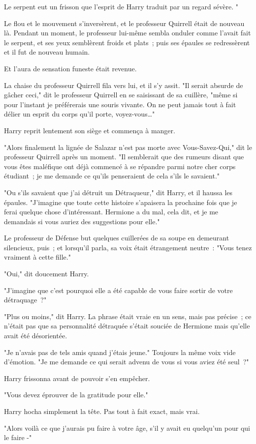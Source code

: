 Le serpent eut un frisson que l'esprit de Harry traduit par un regard sévère. "

Le flou et le mouvement s'inversèrent, et le professeur Quirrell était de nouveau là. Pendant un moment, le professeur lui-même sembla onduler comme l'avait fait le serpent, et ses yeux semblèrent froids et plats~; puis ses épaules se redressèrent et il fut de nouveau humain.

Et l'aura de sensation funeste était revenue.

La chaise du professeur Quirrell fila vers lui, et il s'y assit. "Il serait absurde de gâcher ceci," dit le professeur Quirrell en se saisissant de sa cuillère, "même si pour l'instant je préférerais une souris vivante. On ne peut jamais tout à fait délier un esprit du corps qu'il porte, voyez-vous…"

Harry reprit lentement son siège et commença à manger.

\later

"Alors finalement la lignée de Salazar n'est pas morte avec Vous-Savez-Qui," dit le professeur Quirrell après un moment. "Il semblerait que des rumeurs disant que vous êtes maléfique ont déjà commencé à se répandre parmi notre cher corps étudiant~; je me demande ce qu'ils penseraient de cela s'ils le savaient."

"Ou s'ils savaient que j'ai détruit un Détraqueur," dit Harry, et il haussa les épaules. "J'imagine que toute cette histoire s'apaisera la prochaine fois que je ferai quelque chose d'intéressant. Hermione a du mal, cela dit, et je me demandais si vous auriez des suggestions pour elle."

Le professeur de Défense but quelques cuillerées de sa soupe en demeurant silencieux, puis~; et lorsqu'il parla, sa voix était étrangement neutre~: "Vous tenez vraiment à cette fille."

"Oui," dit doucement Harry.

"J'imagine que c'est pourquoi elle a été capable de vous faire sortir de votre détraquage~?"

"Plus ou moins," dit Harry. La phrase était vraie en un sens, mais pas précise~; ce n'était pas que sa personnalité détraquée s'était souciée de Hermione mais qu'elle avait été désorientée.

"Je n'avais pas de tels amis quand j'étais jeune." Toujours la même voix vide d'émotion. "Je me demande ce qui serait advenu de vous si vous aviez été seul~?"

Harry frissonna avant de pouvoir s'en empêcher.

"Vous devez éprouver de la gratitude pour elle."

Harry hocha simplement la tête. Pas tout à fait exact, mais vrai.

"Alors voilà ce que j'aurais pu faire à votre âge, s'il y avait eu quelqu'un pour qui le faire -" 

